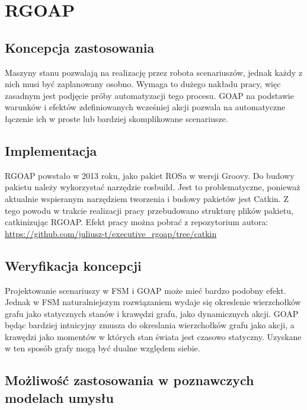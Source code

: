 \section{RGOAP}

\subsection{Koncepcja zastosowania}
Maszyny stanu pozwalają na realizację przez robota scenariuszów, jednak każdy z nich musi być zaplanowany osobno. Wymaga to dużego nakładu pracy, więc zasadnym jest podjęcie próby automatyzacji tego procesu. GOAP na podstawie warunków i efektów zdefiniowanych wcześniej akcji pozwala na automatyczne łączenie ich w proste lub bardziej skomplikowane scenariusze. 

\subsection{Implementacja}
RGOAP powstało w 2013 roku, jako pakiet ROSa w wersji Groovy. Do budowy pakietu należy wykorzystać narzędzie rosbuild. Jest to problematyczne, ponieważ aktualnie wspieranym narzędziem tworzenia i budowy pakietów jest Catkin. Z tego powodu w trakcie realizacji pracy przebudowano strukturę plików pakietu, catkinizując RGOAP. Efekt pracy można pobrać z repozytorium autora: \url{https://github.com/juliusz-t/executive_rgoap/tree/catkin}

\subsection{Weryfikacja koncepcji}

Projektowanie scenariuszy w FSM i GOAP może mieć bardzo podobny efekt. Jednak w FSM naturalniejszym rozwiązaniem wydaje się okreslenie wierzchołków grafu jako statycznych stanów i krawędzi grafu, jako dynamicznych akcji. GOAP będąc bardziej intuicyjny zmusza do okreslania wierzchołków grafu jako akcji, a krawędzi jako momentów w których stan świata jest czasowo statyczny. Uzyskane w ten sposób grafy mogą być dualne względem siebie.

\subsection{Możliwość zastosowania w poznawczych modelach umysłu}

